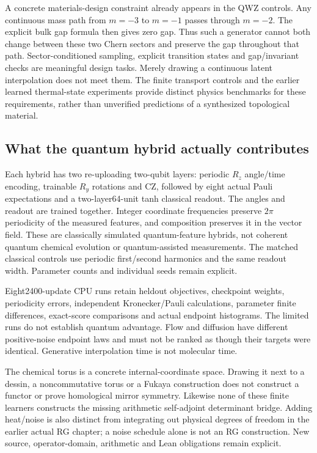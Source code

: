 \documentclass[11pt,oneside,openany]{book}
\theoremstyle{definition}\newtheorem{definition}[theorem]{Definition}
\theoremstyle{remark}\newtheorem{remark}[theorem]{Remark}
\begin{document}
A concrete materials-design constraint already appears in the QWZ controls.
Any continuous mass path from $m=-3$ to $m=-1$ passes through $m=-2$.
The explicit bulk gap formula then gives zero gap. Thus such a generator
cannot both change between these two Chern sectors and preserve the gap
throughout that path. Sector-conditioned sampling, explicit transition
states and gap/invariant checks are meaningful design tasks. Merely drawing
a continuous latent interpolation does not meet them. The finite transport
controls and the earlier learned thermal-state experiments provide distinct
physics benchmarks for these requirements, rather than unverified
predictions of a synthesized topological material.

\subsection{What the quantum hybrid actually contributes}
Each hybrid has two re-uploading two-qubit layers: periodic $R_z$ angle/time
encoding, trainable $R_y$ rotations and CZ, followed by eight actual Pauli
expectations and a two-layer64-unit tanh classical readout. The angles and
readout are trained together. Integer coordinate frequencies preserve
$2\pi$ periodicity of the measured features, and composition preserves it in
the vector field. These are classically simulated quantum-feature hybrids,
not coherent quantum chemical evolution or quantum-assisted measurements.
The matched classical controls use periodic first/second harmonics and the
same readout width. Parameter counts and individual seeds remain explicit.

Eight2400-update CPU runs retain heldout objectives, checkpoint weights,
periodicity errors, independent Kronecker/Pauli calculations, parameter
finite differences, exact-score comparisons and actual endpoint histograms.
The limited runs do not establish quantum advantage. Flow and diffusion have
different positive-noise endpoint laws and must not be ranked as though their
targets were identical. Generative interpolation time is not molecular time.

The chemical torus is a concrete internal-coordinate space. Drawing it next
to a dessin, a noncommutative torus or a Fukaya construction does not construct
a functor or prove homological mirror symmetry. Likewise none of these finite
learners constructs the missing arithmetic self-adjoint determinant bridge.
Adding heat/noise is also distinct from integrating out physical degrees of
freedom in the earlier actual RG chapter; a noise schedule alone is not an RG
construction. New source, operator-domain, arithmetic and Lean obligations remain explicit.
\end{document}
